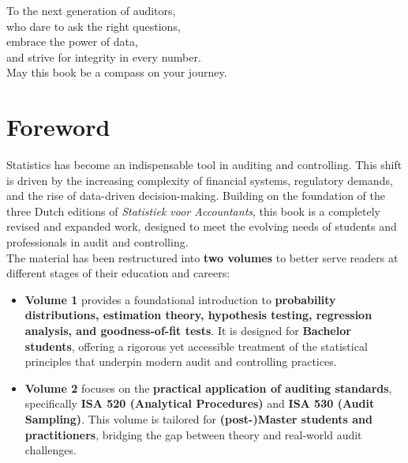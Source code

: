 \documentclass[11pt]{memoir}
\theoremstyle{definition} %
\begin{document}
\cleardoublepage
\listoffigures

\cleardoublepage
\listoftables

\cleardoublepage
\thispagestyle{empty}
\vspace*{\fill}
\begin{center}
\DoubleSpacing
\fontsize{18}{22}\selectfont\itshape

To the next generation of auditors,\\
who dare to ask the right questions,\\
embrace the power of data,\\
and strive for integrity in every number.\\
May this book be a compass on your journey.

\SingleSpacing
\end{center}
\vspace*{\fill}

\cleardoublepage
\chapter*{Foreword}

Statistics has become an indispensable tool in auditing and controlling. This shift is driven by the increasing complexity of financial systems, regulatory demands, and the rise of data-driven decision-making. Building on the foundation of the three Dutch editions of \textit{Statistiek voor Accountants}, this book is a completely revised and expanded work, designed to meet the evolving needs of students and professionals in audit and controlling.\\[0.5em]

The material has been restructured into \textbf{two volumes} to better serve readers at different stages of their education and careers:

\begin{itemize}
    \item \textbf{Volume 1} provides a foundational introduction to \textbf{probability distributions, estimation theory, hypothesis testing, regression analysis, and goodness-of-fit tests}. It is designed for \textbf{Bachelor students}, offering a rigorous yet accessible treatment of the statistical principles that underpin modern audit and controlling practices.
    \item \textbf{Volume 2} focuses on the \textbf{practical application of auditing standards}, specifically \textbf{ISA 520 (Analytical Procedures)} and \textbf{ISA 530 (Audit Sampling)}. This volume is tailored for \textbf{(post-)Master students and practitioners}, bridging the gap between theory and real-world audit challenges.
\end{itemize}
\end{document}
